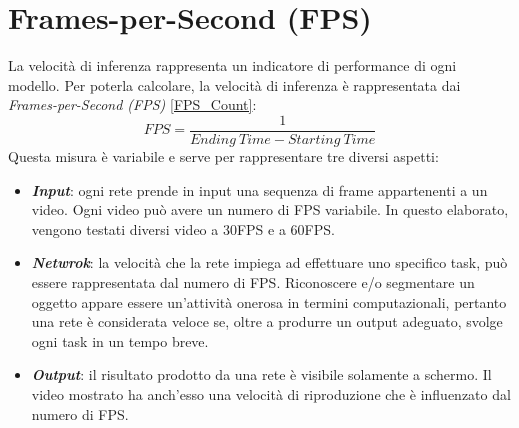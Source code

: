 \section{Frames-per-Second (FPS)}
La velocità di inferenza rappresenta un indicatore di performance di ogni 
modello. Per poterla calcolare, la velocità di inferenza è rappresentata dai 
\emph{Frames-per-Second (FPS)} \ref{FPS_Count}:
\begin{equation}\label{FPS_Count}
    FPS = \frac{1}{Ending \ Time - Starting \ Time}
\end{equation}
Questa misura è variabile e serve per rappresentare tre diversi aspetti:
\begin{itemize}
    \item {\bfseries{\emph{Input}}}: ogni rete prende in input una sequenza di frame appartenenti 
    a un video. Ogni video può avere un numero di FPS variabile. In 
    questo elaborato, vengono testati diversi video a 30FPS e a 60FPS.
    \item {\bfseries{\emph{Netwrok}}}: la velocità che la rete impiega ad effettuare uno specifico 
    task, può essere rappresentata dal numero di FPS. Riconoscere e/o 
    segmentare un oggetto appare essere un'attività onerosa in termini 
    computazionali, pertanto una rete è considerata veloce se, oltre a 
    produrre un output adeguato, svolge ogni task in un tempo breve.
    \item {\bfseries{\emph{Output}}}: il risultato prodotto da una rete è visibile solamente a 
    schermo. Il video mostrato ha anch'esso una velocità di riproduzione 
    che è influenzato dal numero di FPS.
\end{itemize}
